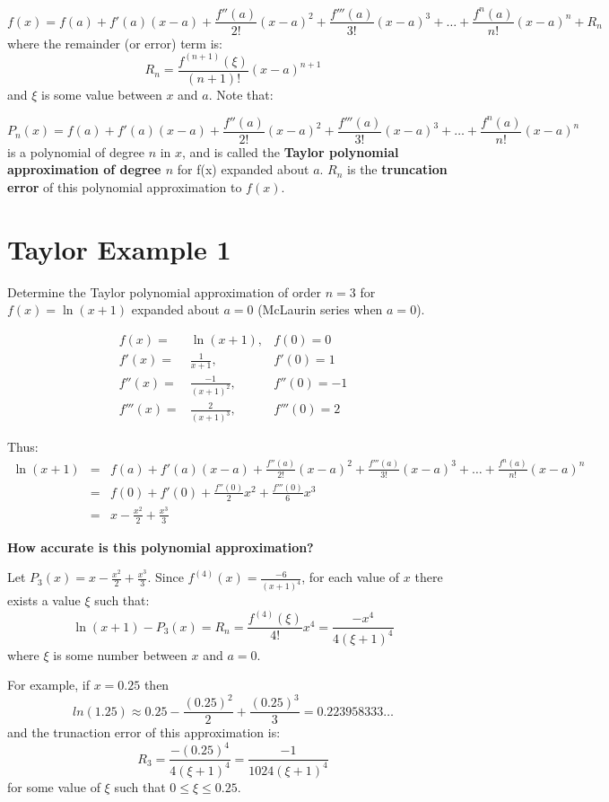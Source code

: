 \documentclass [titlepage,12pt,letter] {article}
\begin{document}
\[
 f(x) = f(a) + f'(a)(x-a) + \frac{f''(a)}{2!}(x-a)^2 + \frac{f'''(a)}{3!}(x-a)^3 + \dots + \frac{f^{n}(a)}{n!}(x-a)^{n} + R_n
\] 
where the remainder (or error) term is: 
\[
R_{n} = \frac{f^{(n+1)}(\xi)}{(n+1)!} (x-a)^{n+1} 
\] 
\noindent 
and $\xi$ is some value between $x$ and $a$. Note that: 

\[
P_n(x) = f(a) + f'(a)(x-a) + \frac{f''(a)}{2!}(x-a)^2 + \frac{f'''(a)}{3!}(x-a)^3 + \dots + \frac{f^{n}(a)}{n!}(x-a)^{n} 
\] 
\noindent 
is a polynomial of degree $n$ in $x$, and is called the {\bf Taylor polynomial approximation of degree $n$} for f(x) expanded about $a$. $R_{n}$ is the {\bf truncation error} of this polynomial approximation to $f(x)$.  


\section{Taylor Example 1} 

Determine the Taylor polynomial approximation of order $n=3$ for 
$f(x) = \ln(x+1)$ expanded about $a=0$ (McLaurin series when 
$a=0$). 

\begin{eqnarray} 
f(x) =& \ln(x+1), & f(0) = 0 \\ 
f'(x) =& \frac{1}{x+1}, & f'(0) = 1 \\ 
f''(x) =& \frac{-1}{(x+1)^2}, & f''(0) = -1 \\ 
f'''(x) =& \frac{2}{(x+1)^3}, & f'''(0) = 2 
\end{eqnarray}

Thus: 
\begin{eqnarray*} 
\ln(x+1) &=& f(a) + f'(a)(x-a) + \frac{f''(a)}{2!}(x-a)^2 + \frac{f'''(a)}{3!}(x-a)^3 + \dots + \frac{f^{n}(a)}{n!}(x-a)^{n} \\ &=&  
f(0) + f'(0) + \frac{f''(0)}{2} x^2 +\frac{f'''(0)}{6}x^{3} \\ 
&=&  x -\frac{x^2}{2} + \frac{x^3}{3} 
\end{eqnarray*}

{\bf How accurate is this polynomial approximation?}

Let $P_3(x) = x - \frac{x^2}{2} + \frac{x^{3}}{3}$. Since 
$f^{(4)} (x) = \frac{-6}{(x+1)^4}$, for each value of $x$ there 
exists a value $\xi$ such that: 
\[ \ln(x+1) - P_{3}(x) = R_n = \frac{f^{(4)}(\xi)}{4!}x^4 = \frac{-x^4}{4(\xi +1)^4}
\]
\noindent 
where $\xi$ is some number between $x$ and $a=0$. 

For example, if $x=0.25$ then 
\[
ln(1.25) \approx 0.25 - \frac{(0.25)^2}{2} + \frac{(0.25)^3}{3} = 0.223958333 \dots 
\]
and the trunaction error of this approximation is: 
\[
R_3 = \frac{-(0.25)^4}{4(\xi+1)^4} = \frac{-1}{1024(\xi+1)^4}
\]
\noindent for some value of $\xi$ such that $0\leq \xi \leq 0.25$. 
\end{document}
